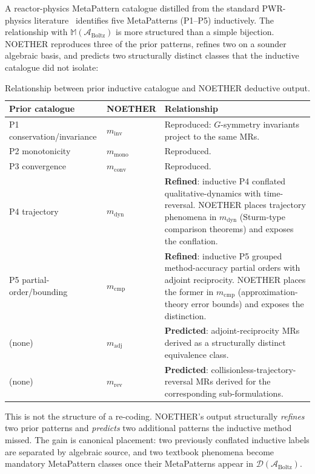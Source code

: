 \documentclass[acmsmall,screen,review]{acmart}
\begin{document}
A reactor-physics MetaPattern catalogue distilled from the standard PWR-physics literature~\cite{BellGlasstone1970, LewisMiller1993} identifies five MetaPatterns (P1--P5) inductively. The relationship with $\mathbb{M}(\mathcal{A}_{\mathrm{Boltz}})$ is more structured than a simple bijection. NOETHER reproduces three of the prior patterns, refines two on a sounder algebraic basis, and predicts two structurally distinct classes that the inductive catalogue did not isolate:

\begin{table}[h]
\centering
\caption{Relationship between prior inductive catalogue and NOETHER deductive output.}
\label{tab:refinement}
\small
\begin{tabular}{p{} p{} p{}}
\toprule
\textbf{Prior catalogue} & \textbf{NOETHER} & \textbf{Relationship} \\
\midrule
P1 conservation/invariance & $m_{\mathrm{inv}}$ & Reproduced: $G$-symmetry invariants project to the same MRs. \\
P2 monotonicity & $m_{\mathrm{mono}}$ & Reproduced. \\
P3 convergence & $m_{\mathrm{conv}}$ & Reproduced. \\
P4 trajectory & $m_{\mathrm{dyn}}$ & \textbf{Refined}: inductive P4 conflated qualitative-dynamics with time-reversal. NOETHER places trajectory phenomena in $m_{\mathrm{dyn}}$ (Sturm-type comparison theorems) and exposes the conflation. \\
P5 partial-order/bounding & $m_{\mathrm{cmp}}$ & \textbf{Refined}: inductive P5 grouped method-accuracy partial orders with adjoint reciprocity. NOETHER places the former in $m_{\mathrm{cmp}}$ (approximation-theory error bounds) and exposes the distinction. \\
(none) & $m_{\mathrm{adj}}$ & \textbf{Predicted}: adjoint-reciprocity MRs derived as a structurally distinct equivalence class. \\
(none) & $m_{\mathrm{rev}}$ & \textbf{Predicted}: collisionless-trajectory-reversal MRs derived for the corresponding sub-formulations. \\
\bottomrule
\end{tabular}
\end{table}

This is not the structure of a re-coding. NOETHER's output structurally \emph{refines} two prior patterns and \emph{predicts} two additional patterns the inductive method missed. The gain is canonical placement: two previously conflated inductive labels are separated by algebraic source, and two textbook phenomena become mandatory MetaPattern classes once their MetaPatterns appear in $\mathcal{D}(\mathcal{A}_{\mathrm{Boltz}})$.
\end{document}
